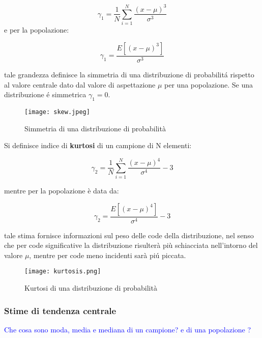\documentclass[11pt,a4paper]{book}
\begin{document}
\begin{equation}
	\gamma_{1} = \dfrac{1}{N}\sum_{i=1}^N \dfrac{(x-\mu)^3}{\sigma^3}
\end{equation}
 e per la popolazione:
 
 \begin{equation}
 	\gamma_{1} = \dfrac{E[(x-\mu)^3]}{\sigma^3}
 \end{equation}
 
 tale grandezza definisce la simmetria di una distribuzione di probabilit\'{a} rispetto al valore centrale dato dal valore di aspettazione $\mu$ per una popolazione. Se una distribuzione \'{e} simmetrica $\gamma_{1} = 0 $.
 
  
\begin{figure}[!ht]

\texttt{[image: skew.jpeg]}	
\centering
\caption{Simmetria di una distribuzione di probabilit\`{a}}
\end{figure}


Si definisce indice di \textbf{kurtosi} di un campione di N elementi:

\begin{equation}
	\gamma_{2} = \dfrac{1}{N}\sum_{i=1}^N\dfrac{(x-\mu)^4}{\sigma^4}-3
\end{equation}

mentre per la popolazione \`{e} data da:

\begin{equation}
	\gamma_2 = \dfrac{E[(x-\mu)^4]}{\sigma^4} -3
\end{equation}

tale stima fornisce informazioni sul peso delle code della distribuzione, nel senso che per code significative la distribuzione risulter\`{a} pi\`{u} schiacciata nell'intorno del valore $\mu$, mentre per code meno incidenti sar\`{a} pi\'{u} piccata.


\begin{figure}[!ht]

\texttt{[image: kurtosis.png]}	
\centering
\caption{Kurtosi di una distribuzione di probabilit\`{a}}
\end{figure}


\subsubsection{Stime di tendenza centrale}

\textcolor{blue}{Che cosa sono moda, media e mediana di un campione? e di una popolazione ?}
\end{document}
